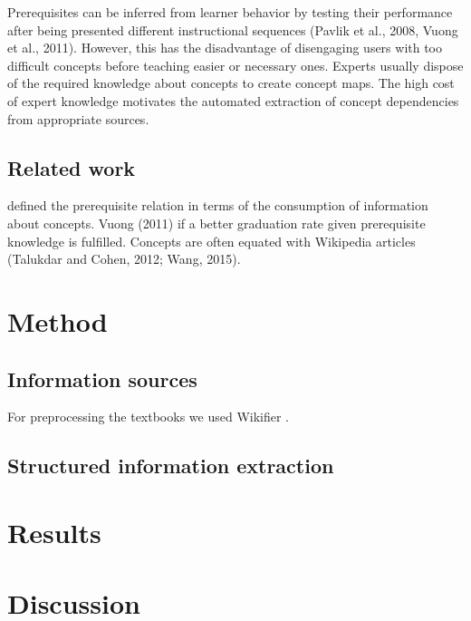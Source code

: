 \documentclass{article}
\begin{document}
Prerequisites can be inferred from learner behavior by testing their performance after being presented different instructional sequences (Pavlik et al., 2008, Vuong et al., 2011). However, this has the disadvantage of disengaging users with too difficult concepts before teaching easier or necessary ones. Experts usually dispose of the required knowledge about concepts to create concept maps. The high cost of expert knowledge motivates the automated extraction of concept dependencies from appropriate sources.






\subsection{Related work}
\cite{talukdar2012crowdsourced} defined the prerequisite relation in terms of the consumption of information about concepts. Vuong (2011) if a better graduation rate given prerequisite knowledge is fulfilled. Concepts are often equated with Wikipedia articles (Talukdar and Cohen, 2012; Wang, 2015).

\section{Method}

\subsection{Information sources}
For preprocessing the textbooks we used Wikifier \citep{brank2017annotating}.

\subsection{Structured information extraction}



\section{Results}



\section{Discussion}





\end{document}
